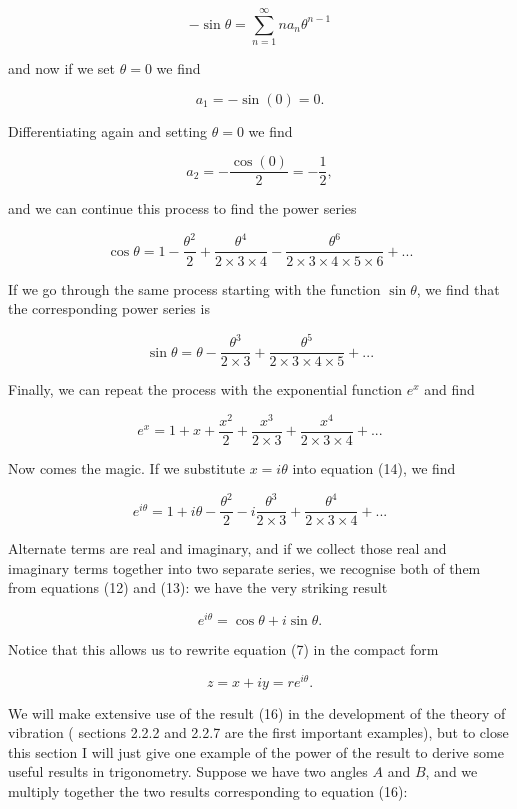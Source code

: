   $$-\sin \theta = \sum_{n=1}^\infty{n a_n \theta^{n-1}} \tag{9}$$ 

  and now if we set $\theta=0$ we find 

  $$a_1 = -\sin(0)=0. \tag{10}$$ 

  Differentiating again and setting $\theta=0$ we find 

  $$a_2 = -\dfrac{\cos(0)}{2} = -\dfrac{1}{2}, \tag{11}$$ 

  and we can continue this process to find the power series 

  $$\cos \theta = 1-\dfrac{\theta^2}{2}+\dfrac{\theta^4}{2 \times 3 \times 
  4}-\dfrac{\theta^6}{2 \times 3 \times 4 \times 5 \times 6} +...\tag{12}$$ 

  If we go through the same process starting with the function $\sin \theta$, 
  we find that the corresponding power series is 

  $$\sin \theta = \theta -\dfrac{\theta^3}{2 \times 3} + \dfrac{\theta^5}{2 
  \times 3 \times 4 \times 5}+... \tag{13}$$ 

  Finally, we can repeat the process with the exponential function $e^x$ and 
  find 

  $$e^x = 1+x+\dfrac{x^2}{2}+\dfrac{x^3}{2 \times 3}+\dfrac{x^4}{2 \times 3 
  \times 4}+... \tag{14}$$ 

  Now comes the magic. If we substitute $x=i\theta$ into equation (14), we find 

  $$e^{i \theta} = 1+i \theta-\dfrac{\theta^2}{2}-i\dfrac{\theta^3}{2 \times 
  3}+\dfrac{\theta^4}{2 \times 3 \times 4}+... \tag{15}$$ 

  Alternate terms are real and imaginary, and if we collect those real and 
  imaginary terms together into two separate series, we recognise both of them 
  from equations (12) and (13): we have the very striking result 

  $$e^{i \theta} = \cos \theta + i \sin \theta . \tag{16}$$ 

  Notice that this allows us to rewrite equation (7) in the compact form 

  $$z=x+iy=r e^{i \theta}. \tag{17}$$ 

  We will make extensive use of the result (16) in the development of the 
  theory of vibration ( sections 2.2.2 and 2.2.7 are the first important 
  examples), but to close this section I will just give one example of the 
  power of the result to derive some useful results in trigonometry. Suppose we 
  have two angles $A$ and $B$, and we multiply together the two results 
  corresponding to equation (16): 

